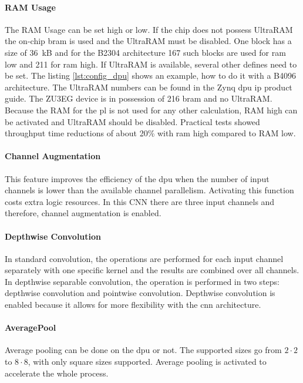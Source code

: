 \paragraph{RAM Usage}
The RAM Usage can be set high or low.
If the chip does not possess UltraRAM the on-chip \acrshort{bram} is used and the UltraRAM must be disabled.
One block has a size of \SI{36}{kB} and for the B2304 architecture 167 such blocks are used for \acrshort{ram} low and 211 for \acrshort{ram} high.
If UltraRAM is available, several other defines need to be set.
The listing \ref{lst:config_dpu} shows an example, how to do it with a B4096 architecture.
The UltraRAM numbers can be found in the Zynq \acrshort{dpu} \acrshort{ip} product guide.
The ZU3EG device is in possession of 216 \acrfull{bram} and no UltraRAM.
Because the RAM for the \acrshort{pl} is not used for any other calculation, RAM high can be activated and UltraRAM should be disabled.
Practical tests showed throughput time reductions of about 20\% with \acrshort{ram} high compared to RAM low.

\paragraph{Channel Augmentation}
This feature improves the efficiency of the \acrshort{dpu} when the number of input channels is lower than the available channel parallelism.
Activating this function costs extra logic resources.
In this CNN there are three input channels and therefore, channel augmentation is enabled.

\paragraph{Depthwise Convolution}
In standard convolution, the operations are performed for each input channel separately with one specific kernel and the results are combined over all channels.
In depthwise separable convolution, the operation is performed in two steps: depthwise convolution and pointwise convolution.
Depthwise convolution is enabled because it allows for more flexibility with the \acrshort{cnn} architecture.

\paragraph{AveragePool}
Average pooling can be done on the \acrshort{dpu} or not.
The supported sizes go from $2\cdot2$ to $8\cdot8$, with only square sizes supported.
Average pooling is activated to accelerate the whole process.

